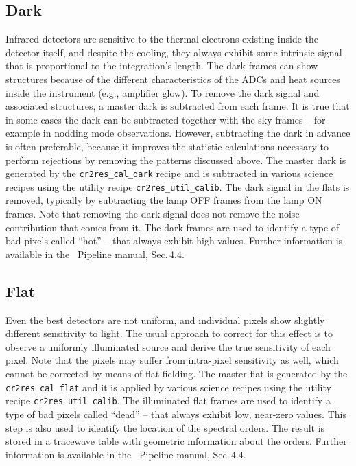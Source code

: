 \subsection{Dark}

Infrared detectors are sensitive to the thermal electrons existing inside the detector itself, and despite the cooling, they always exhibit some intrinsic signal that is proportional to the integration's length. The dark frames can show structures because of the different characteristics of the ADCs and heat sources inside the instrument (e.g., amplifier glow). To remove the dark signal and associated structures, a master dark is subtracted from each frame. It is true that in some cases the dark can be subtracted together with the sky frames -- for example in nodding mode observations. However, subtracting the dark in advance is often preferable, because it improves the statistic calculations necessary to perform rejections by removing the patterns discussed above. The master dark is generated by the {\tt cr2res\_cal\_dark} recipe and is subtracted in various science recipes using the utility recipe {\tt cr2res\_util\_calib}. The dark signal in the flats is removed, typically by subtracting the lamp OFF frames from the lamp ON frames. Note that removing the dark signal does not remove the noise contribution that comes from it. The dark frames are used to identify a type of bad pixels called ``hot'' -- that always exhibit high values. Further information is available in the \instname\ Pipeline manual, Sec.\,4.4. 


\subsection{Flat}

Even the best detectors are not uniform, and individual pixels show slightly different sensitivity to light. The usual approach to correct for this effect is to observe a uniformly illuminated source and derive the true sensitivity of each pixel. Note that the pixels may suffer from intra-pixel sensitivity as well, which cannot be corrected by means of flat fielding.
The master flat is generated by the {\tt cr2res\_cal\_flat} and it is applied by various science recipes using the utility recipe {\tt cr2res\_util\_calib}. The illuminated flat frames are used to identify a type of bad pixels called ``dead'' -- that always exhibit low, near-zero values. This step is also used to identify the location of the spectral orders. The result is stored in a tracewave table with geometric information about the orders. Further information is available in the \instname\ Pipeline manual, Sec.\,4.4.


